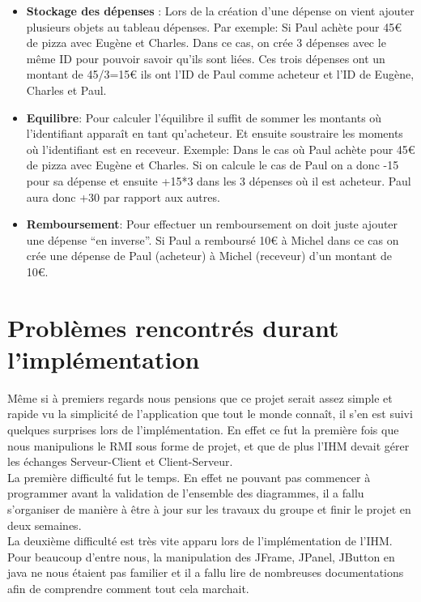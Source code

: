 \documentclass[12,french]{report}
\begin{document}
\begin{itemize}[label=\textbullet]
\item \textbf{Stockage des dépenses} : Lors de la création d’une dépense on vient ajouter plusieurs objets au tableau dépenses. Par exemple:
Si Paul achète pour 45€ de pizza avec Eugène et Charles.
Dans ce cas, on crée 3 dépenses avec le même ID pour pouvoir savoir qu’ils sont liées. Ces trois dépenses ont un montant de 45/3=15€ ils ont l’ID de Paul comme acheteur et l’ID de Eugène, Charles et Paul.\\

\item \textbf{Equilibre}:
Pour calculer l’équilibre il suffit de sommer les montants où l’identifiant apparaît en tant qu’acheteur. Et ensuite soustraire les moments où l’identifiant est en receveur.
Exemple: Dans le cas où Paul achète pour 45€ de pizza avec Eugène et Charles. Si on calcule le cas de Paul on a donc -15 pour sa dépense et ensuite +15*3 dans les 3 dépenses où il est acheteur. Paul aura donc +30 par rapport aux autres.

\item \textbf{Remboursement}:
Pour effectuer un remboursement on doit juste ajouter une dépense “en inverse”. Si Paul a remboursé 10€ à Michel dans ce cas on crée une dépense de Paul (acheteur) à Michel (receveur) d’un montant de 10€.

\end{itemize}

\chapter{Problèmes rencontrés durant l'implémentation}

Même si à premiers regards nous pensions que ce projet serait assez simple et rapide vu la simplicité de l'application que tout le monde connaît, il s'en est suivi quelques surprises lors de l'implémentation. En effet ce fut la première fois que nous manipulions le RMI sous forme de projet, et que de plus l'IHM devait gérer les échanges Serveur-Client et Client-Serveur.\\

La première difficulté fut le temps. En effet ne pouvant pas commencer à programmer avant la validation de l'ensemble des diagrammes, il a fallu s'organiser de manière à être à jour sur les travaux du groupe et finir le projet en deux semaines.\\

La deuxième difficulté est très vite apparu lors de l'implémentation de l'IHM. Pour beaucoup d'entre nous, la manipulation des JFrame, JPanel, JButton en java ne nous étaient pas familier et il a fallu lire de nombreuses documentations afin de comprendre comment tout cela marchait. \\
\end{document}
